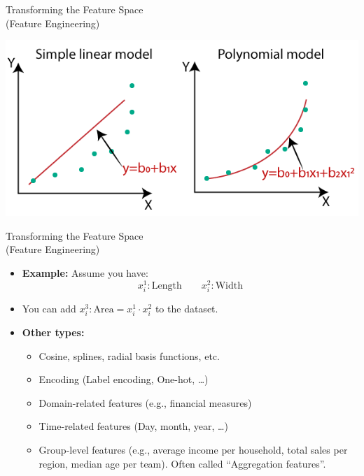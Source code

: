 \begin{frame}{Transforming the Feature Space \\ (Feature Engineering)}
\begin{center}
    \includegraphics[width=0.9\linewidth]{images/linear-regression/linear-regression-12.png}
\end{center}
\end{frame}


\begin{frame}{Transforming the Feature Space \\ (Feature Engineering)}
\begin{itemize}
    \item \textbf{Example:} Assume you have: 
    \[
    x_i^1: \text{Length} \qquad x_i^2: \text{Width}
    \]
    
    \item You can add \( x_i^3: \text{Area} = x_i^1 \cdot x_i^2 \) to the dataset.
    
    \item \textbf{Other types:}
    \begin{itemize}
        \item Cosine, splines, radial basis functions, etc.
        \item Encoding (Label encoding, One-hot, \dots)
        \item Domain-related features (e.g., financial measures)
        \item Time-related features (Day, month, year, \dots)
        \item Group-level features (e.g., average income per household, total sales per region, median age per team). Often called ``Aggregation features''.
    \end{itemize}
\end{itemize}
\end{frame}
